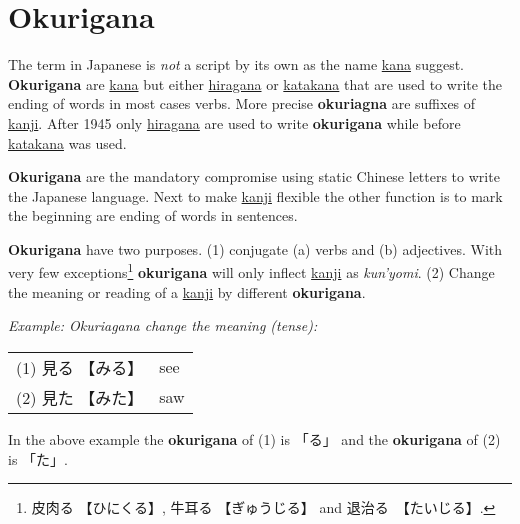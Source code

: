 \section{Okurigana}
\label{sec:Okurigana}
\label{sec:Nokurigana}

The term  in Japanese is
\textit{not} a script by its own as the name \hyperref[sec:Kana]{kana} suggest.
\textbf{Okurigana} are \hyperref[sec:Kana]{kana} but either
\hyperref[sec:Hiragana]{hiragana} or \hyperref[sec:Katakana]{katakana} that are
used to write the ending of words in most cases verbs. More precise
\textbf{okuriagna} are suffixes of \hyperref[sec:Kanji]{kanji}. After 1945 only
\hyperref[sec:Hiragana]{hiragana} are used to write \textbf{okurigana} while
before \hyperref[sec:Katakana]{katakana} was used.

\textbf{Okurigana} are the mandatory compromise using static Chinese letters to
write the Japanese language. Next to make \hyperref[sec:Kanji]{kanji} flexible
the other function is to mark the beginning are ending of words in sentences.

\textbf{Okurigana} have two purposes. (1) conjugate (a) verbs and (b)
adjectives. With very few exceptions\footnote{ {皮肉る} {【ひにくる】},
{牛耳る}  {【ぎゅうじる】} and {退治る}　{【たいじる】}.}  \textbf{okurigana}
will only inflect \hyperref[sec:Kanji]{kanji} as \textit{kun'yomi}.  (2) Change
the meaning or reading of a \hyperref[sec:Kanji]{kanji} by different
\textbf{okurigana}.

\textit{Example: Okuriagana change the meaning (tense):}

\medskip
\begin{tabular}{ll}
\hspace{2cm}(1) {見る} {【みる】} & see \\
\hspace{2cm}(2) {見た} {【みた】} & saw \\
\end{tabular}

\medskip
In the above example the \textbf{okurigana} of (1) is {「る」} and the
\textbf{okurigana} of (2) is {「た」}.

